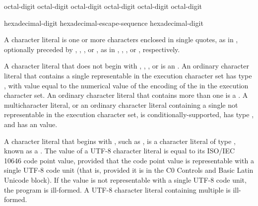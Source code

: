 \begin{bnf}
\br
    \terminal{\textbackslash} octal-digit\br
    \terminal{\textbackslash} octal-digit octal-digit\br
    \terminal{\textbackslash} octal-digit octal-digit octal-digit
\end{bnf}

\begin{bnf}
\br
     hexadecimal-digit\br
    hexadecimal-escape-sequence hexadecimal-digit
\end{bnf}

\pnum
{}%
%
%
%
A character literal is one or more characters enclosed in single quotes,
as in , optionally preceded by
, , , or ,
as in
, , , or ,
respectively.

\pnum
{}%
%
A character literal that does not begin with
, , , or 
is an .
An ordinary character literal that contains a
single  representable in the execution character
set has type , with value equal to the
numerical value of the encoding of the  in the
execution character set. An ordinary character literal that contains
more than one  is a
%
.
A multicharacter literal, or an ordinary character literal containing
a single  not representable in the execution
character set, is conditionally-supported, has type ,
%
and has an  value.

\pnum
{}%
A character literal that
begins with , such as ,
%
is a character literal of type ,
known as a .
The value of a UTF-8 character literal
is equal to its ISO/IEC 10646 code point value,
provided that the code point value
is representable with a single UTF-8 code unit
(that is, provided it is in the C0 Controls and Basic Latin Unicode block).
If the value is not representable with a single UTF-8 code unit,
the program is ill-formed.
A UTF-8 character literal containing multiple  is ill-formed.

